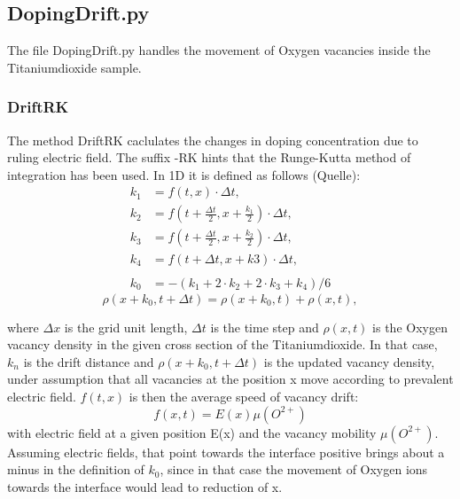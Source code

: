 \documentclass[12pt]{article}
\begin{document}
	\subsection{DopingDrift.py}
	The file DopingDrift.py handles the movement of Oxygen vacancies inside the Titaniumdioxide sample.
	
		\subsubsection{DriftRK}
		The method DriftRK caclulates the changes in doping concentration due to ruling electric field. The suffix -RK hints that the Runge-Kutta method of integration has been used. In 1D it is defined as follows (Quelle):
		\begin{align*}		
		k_1 &= f(t, x) \cdot \Delta t,																			\\
		k_2 &= f(t + \frac{\Delta t}{2}, x + \frac{k_1}{2}) \cdot \Delta t, \\
		k_3 &= f(t + \frac{\Delta t}{2}, x + \frac{k_2}{2}) \cdot \Delta t, \\
		k_4 &= f(t + \Delta t, x + k3)  \cdot \Delta t,
		\\ \\
		k_0 &= -(k_1 + 2\cdot k_2 + 2\cdot k_3 + k_4)/6
		\end{align*}
		\begin{equation}
		\label{eq:DensityDrift}
		\rho(x + k_0, t + \Delta t) = \rho(x + k_0, t) + \rho(x, t),
		\end{equation}			
		
		where $\Delta x$ is the grid unit length, $\Delta t$ is the time step and $\rho (x,t)$ is the Oxygen vacancy density in the given cross section of the Titaniumdioxide. In that case, $k_n$ is the drift distance and $\rho(x + k_0, t + \Delta t)$ is the updated vacancy density, under assumption that all vacancies at the position x move according to prevalent electric field. $f(t,x)$ is then the average speed of vacancy drift:
		\begin{equation}
		f(x,t) = E(x) \mu (O^{2+})
		\end{equation}	
		with electric field at a given position E(x) and the vacancy mobility $\mu(O^{2+})$. Assuming electric fields, that point towards the interface positive brings about a minus in the definition of $k_0$, since in that case the movement of Oxygen ions towards the interface would lead to reduction of x.\\
		
\end{document}
